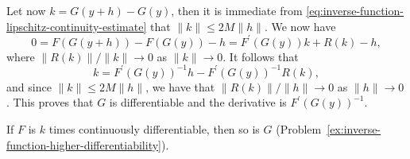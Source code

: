 \begin{Proof}
Let now $k=G(y+h)-G(y)$, then it is immediate from \eqref{eq:inverse-function-lipschitz-continuity-estimate} that $\|k\|\leq2M\|h\|$. We now have
\begin{equation}\label{eq:inverse-function-differentiability-remainder-expansion}
0=F(G(y+h))-F(G(y))-h=F^{\prime}(G(y))k+R(k)-h,
\end{equation}
where $\|R(k)\|/\|k\|\to0$ as $\|k\|\to0$. It follows that
\begin{equation}\label{eq:inverse-function-increment-linearization}
k=F^{\prime}(G(y))^{-1}h-F^{\prime}(G(y))^{-1}R(k),
\end{equation}
and since $\|k\|\leq2M\|h\|$, we have that $\|R(k)\|/\|h\|\to0$ as $\|h\|\to0$. This proves that $G$ is differentiable and the derivative is $F^{\prime}(G(y))^{-1}$.
\end{Proof}
\endgroup

\begin{Remark}
\label{rem:inverse-function-higher-differentiability}
If $F$ is $k$ times continuously differentiable, then so is $G$ (Problem~\ref{ex:inverse-function-higher-differentiability}).
\end{Remark}
